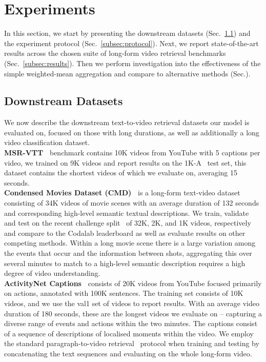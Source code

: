 \section{Experiments}

In this section, we start by presenting the downstream datasets (Sec.~\ref{subsec:datasets})
and the experiment protocol (Sec.~\ref{subsec:protocol}). Next, we report state-of-the-art results across the chosen suite of long-form video retrieval benchmarks (Sec.~\ref{subsec:results}). Then we perform investigation into the effectiveness of the simple weighted-mean aggregation and compare to alternative methods (Sec.\label{subsec:ablation}).

\subsection{Downstream Datasets}
\label{subsec:datasets}
We now describe the downstream text-to-video retrieval datasets our model is evaluated on, focused on those with long durations, as well as additionally a long video classification dataset.
\\
\noindent\textbf{MSR-VTT~\cite{xu2016msr}} benchmark contains 10K videos from YouTube with 5 captions per video, we trained on 9K videos and report results on the 1K-A~\cite{yu2018joint} test set, this dataset contains the shortest videos of which we evaluate on, averaging 15 seconds.
\\
\noindent\textbf{Condensed Movies Dataset (CMD)~\cite{bain2020condensed}} is a long-form text-video dataset consisting of 34K videos of movie scenes with an average duration of 132 seconds and corresponding high-level semantic textual descriptions. We train, validate and test on the recent challenge split~\cite{CMD_chall} of 32K, 2K, and 1K videos, respectively and compare to the Codalab leaderboard as well as evaluate results on other competing methods. Within a long movie scene there is a large variation among the events that occur and the information between shots, aggregating this over several minutes to match to a high-level semantic description requires a high degree of video understanding.
\\
\noindent\textbf{ActivityNet Captions~\cite{krishna2017dense}} consists of 20K videos from YouTube focused primarily on actions, annotated with 100K sentences. The training set consists of 10K videos, and we use the val1 set of videos to report results. With an average video duration of 180 seconds, these are the longest videos we evaluate on -- capturing a diverse range of events and actions within the two minutes. The captions consist of a sequence of descriptions of localised moments within the video. We employ the standard paragraph-to-video retrieval~\cite{Bain21} protocol when training and testing by concatenating the text sequences and evaluating on the whole long-form video.

